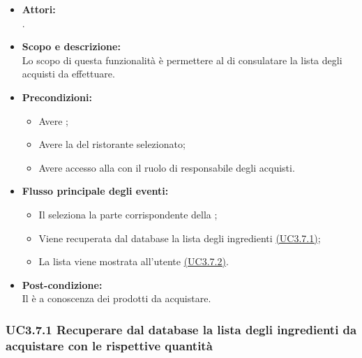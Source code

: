 \begin{itemize}
	\item \textbf{Attori:}
	\\.
	\item \textbf{Scopo e descrizione:} 
	\\Lo scopo di questa funzionalità è permettere al  di consulatare la lista degli acquisti da effettuare.
	\item \textbf{Precondizioni:}
	\begin{itemize}
		\item Avere ;
		\item Avere la  del ristorante selezionato;
		\item Avere accesso alla  con il ruolo di responsabile degli acquisti.
	\end{itemize}
	\item \textbf{Flusso principale degli eventi:}
	\begin{itemize}
		\item Il  seleziona la parte corrispondente della ;
		\item Viene recuperata dal database la lista degli ingredienti \hyperref[UC3.7.1]{(UC3.7.1)};
		\item La lista viene mostrata all'utente \hyperref[UC3.7.2]{(UC3.7.2)}.
	\end{itemize}
	\item \textbf{Post-condizione:}
	\\Il {} è a conoscenza dei prodotti da acquistare.
\end{itemize}

\subsubsection{UC3.7.1 Recuperare dal database la lista degli ingredienti da acquistare con le rispettive quantità} \label{UC3.7.1}

